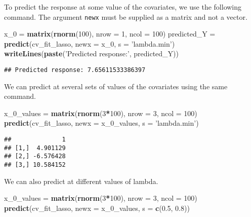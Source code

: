 \documentclass[
]{book}
\newenvironment{Shaded}{\begin{snugshade}}{\end{snugshade}}
\newcommand{\DataTypeTok}[1]{\textcolor[rgb]{0.13,0.29,0.53}{#1}}
\newcommand{\DecValTok}[1]{\textcolor[rgb]{0.00,0.00,0.81}{#1}}
\newcommand{\FloatTok}[1]{\textcolor[rgb]{0.00,0.00,0.81}{#1}}
\newcommand{\KeywordTok}[1]{\textcolor[rgb]{0.13,0.29,0.53}{\textbf{#1}}}
\newcommand{\NormalTok}[1]{#1}
\newcommand{\OperatorTok}[1]{\textcolor[rgb]{0.81,0.36,0.00}{\textbf{#1}}}
\newcommand{\StringTok}[1]{\textcolor[rgb]{0.31,0.60,0.02}{#1}}
\begin{document}
To predict the response at some value of the covariates, we use the following command. The argument \texttt{newx} must be supplied as a matrix and not a vector.

\begin{Shaded}
\begin{Highlighting}[]
\NormalTok{x_}\DecValTok{0}\NormalTok{ =}\StringTok{ }\KeywordTok{matrix}\NormalTok{(}\KeywordTok{rnorm}\NormalTok{(}\DecValTok{100}\NormalTok{), }\DataTypeTok{nrow =} \DecValTok{1}\NormalTok{, }\DataTypeTok{ncol =} \DecValTok{100}\NormalTok{)}
\NormalTok{predicted_Y =}\StringTok{ }\KeywordTok{predict}\NormalTok{(cv_fit_lasso, }\DataTypeTok{newx =}\NormalTok{ x_}\DecValTok{0}\NormalTok{, }\DataTypeTok{s =} \StringTok{'lambda.min'}\NormalTok{)}
\KeywordTok{writeLines}\NormalTok{(}\KeywordTok{paste}\NormalTok{(}\StringTok{'Predicted response:'}\NormalTok{, predicted_Y))}
\end{Highlighting}
\end{Shaded}

\begin{verbatim}
## Predicted response: 7.65611533386397
\end{verbatim}

We can predict at several sets of values of the covariates using the same command.

\begin{Shaded}
\begin{Highlighting}[]
\NormalTok{x_}\DecValTok{0}\NormalTok{_values =}\StringTok{ }\KeywordTok{matrix}\NormalTok{(}\KeywordTok{rnorm}\NormalTok{(}\DecValTok{3}\OperatorTok{*}\DecValTok{100}\NormalTok{), }\DataTypeTok{nrow =} \DecValTok{3}\NormalTok{, }\DataTypeTok{ncol =} \DecValTok{100}\NormalTok{)}
\KeywordTok{predict}\NormalTok{(cv_fit_lasso, }\DataTypeTok{newx =}\NormalTok{ x_}\DecValTok{0}\NormalTok{_values, }\DataTypeTok{s =} \StringTok{'lambda.min'}\NormalTok{)}
\end{Highlighting}
\end{Shaded}

\begin{verbatim}
##              1
## [1,]  4.901129
## [2,] -6.576428
## [3,] 10.584152
\end{verbatim}

We can also predict at different values of lambda.

\begin{Shaded}
\begin{Highlighting}[]
\NormalTok{x_}\DecValTok{0}\NormalTok{_values =}\StringTok{ }\KeywordTok{matrix}\NormalTok{(}\KeywordTok{rnorm}\NormalTok{(}\DecValTok{3}\OperatorTok{*}\DecValTok{100}\NormalTok{), }\DataTypeTok{nrow =} \DecValTok{3}\NormalTok{, }\DataTypeTok{ncol =} \DecValTok{100}\NormalTok{)}
\KeywordTok{predict}\NormalTok{(cv_fit_lasso, }\DataTypeTok{newx =}\NormalTok{ x_}\DecValTok{0}\NormalTok{_values, }\DataTypeTok{s =} \KeywordTok{c}\NormalTok{(}\FloatTok{0.5}\NormalTok{, }\FloatTok{0.8}\NormalTok{))}
\end{Highlighting}
\end{Shaded}
\end{document}
